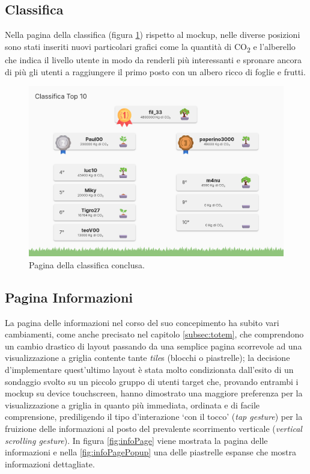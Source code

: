 \subsection{Classifica}
Nella pagina della classifica (figura \ref{fig:top10screen}) rispetto al mockup, nelle diverse posizioni sono stati inseriti nuovi particolari grafici come la quantità di CO\textsubscript{2} e l'alberello che indica il livello utente in modo da renderli più interessanti e spronare ancora di più gli utenti a raggiungere il primo posto con un albero ricco di foglie e frutti.
\begin{figure}[h!]
  \centering
  \includegraphics[width=\textwidth]{img/totem/screenshot/top10screen.png}
  \caption{Pagina della classifica conclusa.}
  \label{fig:top10screen}
\end{figure}

%
%
\subsection{Pagina Informazioni}
La pagina delle informazioni nel corso del suo concepimento ha subito vari cambiamenti, come anche precisato nel capitolo \ref{subsec:totem}, che comprendono un cambio drastico di layout passando da una semplice pagina scorrevole ad una visualizzazione a griglia contente tante \textit{tile}s (blocchi o piastrelle); la decisione d'implementare quest'ultimo layout è stata molto condizionata dall'esito di un sondaggio svolto su un piccolo gruppo di utenti target che, provando entrambi i mockup su device touchscreen, hanno dimostrato una maggiore preferenza per la visualizzazione a griglia in quanto più immediata, ordinata e di facile comprensione, prediligendo il tipo d'interazione \enquote*{con il tocco} (\textit{tap gesture}) per la fruizione delle informazioni al posto del prevalente scorrimento verticale (\textit{vertical scrolling gesture}). In figura \ref{fig:infoPage} viene mostrata la pagina delle informazioni e nella \ref{fig:infoPagePopup} una delle piastrelle espanse che mostra informazioni dettagliate.

